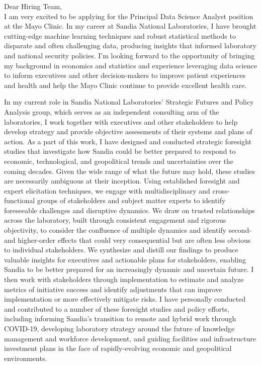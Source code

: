\documentclass[10pt]{article}
\begin{document}
	

\noindent Dear Hiring Team,\\

I am very excited to be applying for the Principal Data Science Analyst position at the Mayo Clinic. In my career at Sandia National Laboratories, I have brought cutting-edge machine learning techniques and robust statistical methods to disparate and often challenging data, producing insights that informed laboratory and national security policies. I'm looking forward to the opportunity of bringing my background in economics and statistics and experience leveraging data science to inform executives and other decision-makers to improve patient experiences and health and help the Mayo Clinic  continue to provide excellent health care.

In my current role in Sandia National Laboratories' Strategic Futures and Policy Analysis group, which serves as an independent consulting arm of the laboratories, I work together with executives and other stakeholders to help develop strategy and provide objective assessments of their systems and plans of action. As a part of this work, I have designed and conducted strategic foresight studies that investigate how Sandia could be better prepared to respond to economic, technological, and geopolitical trends and uncertainties over the coming decades. Given the wide range of what the future may hold, these studies are necessarily ambiguous at their inception. Using established foresight and expert elicitation techniques, we engage with multidisciplinary and cross-functional groups of stakeholders and subject matter experts to identify foreseeable challenges and disruptive dynamics. We draw on trusted relationships across the laboratory, built through consistent engagement and rigorous objectivity, to consider the confluence of multiple dynamics and identify second- and higher-order effects that could very consequential but are often less obvious to individual stakeholders. We synthesize and distill our findings to produce valuable insights for executives and actionable plans for stakeholders, enabling Sandia to be better prepared for an increasingly dynamic and uncertain future. I then work with stakeholders through implementation to estimate and analyze metrics of initiative success and identify adjustments that can improve implementation or more effectively mitigate risks. I have personally conducted and contributed to a number of these foresight studies and policy efforts, including informing Sandia's transition to remote and hybrid work through COVID-19, developing laboratory strategy around the future of knowledge management and workforce development, and guiding facilities and infrastructure investment plans in the face of rapidly-evolving economic and geopolitical environments.
\end{document}
